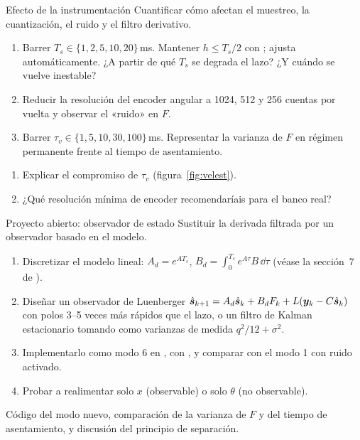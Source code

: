 \begin{practica}{Efecto de la instrumentación}
\objetivos Cuantificar cómo afectan el muestreo, la cuantización, el ruido y el filtro derivativo.
\procedimiento
\begin{enumerate}
  \item Barrer $T_s\in\{1,2,5,10,20\}$\,ms. Mantener $h\le T_s/2$ con ;  ajusta  automáticamente. ¿A partir de qué $T_s$ se degrada el lazo? ¿Y cuándo se vuelve inestable?
  \item Reducir la resolución del encoder angular a 1024, 512 y 256 cuentas por vuelta y observar el «ruido» en $F$.
  \item Barrer $\tau_v\in\{1,5,10,30,100\}$\,ms. Representar la varianza de $F$ en régimen permanente frente al tiempo de asentamiento.
\end{enumerate}
\preguntas
\begin{enumerate}
  \item Explicar el compromiso de $\tau_v$ (figura~\ref{fig:velest}).
  \item ¿Qué resolución mínima de encoder recomendaríais para el banco real?
\end{enumerate}
\end{practica}

\begin{practica}{Proyecto abierto: observador de estado}
\objetivos Sustituir la derivada filtrada por un observador basado en el modelo.
\procedimiento
\begin{enumerate}
  \item Discretizar el modelo lineal: $A_d=e^{AT_s}$, $B_d=\int_0^{T_s}e^{A\tau}B\,\dd\tau$ (véase la sección~7 de ).
  \item Diseñar un observador de Luenberger $\hat{\bm{s}}_{k+1}=A_d\hat{\bm{s}}_k+B_dF_k+L(\bm{y}_k-C\hat{\bm{s}}_k)$ con polos 3--5 veces más rápidos que el lazo, o un filtro de Kalman estacionario tomando como varianzas de medida $q^2/12+\sigma^2$.
  \item Implementarlo como modo 6 en , con , y comparar con el modo 1 con ruido activado.
  \item Probar a realimentar solo $x$ (observable) o solo $\theta$ (no observable).
\end{enumerate}
\entregables Código del modo nuevo, comparación de la varianza de $F$ y del tiempo de asentamiento, y discusión del principio de separación.
\end{practica}
